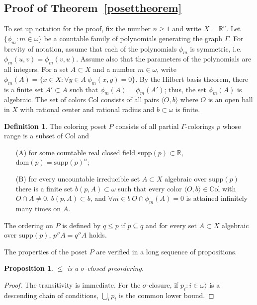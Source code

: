 \documentclass{article}
\newcommand{\gw}{\omega}
\newcommand{\gs}{\sigma}
\newcommand{\supp}{\mathrm{supp}}
\newcommand{\dom}{\mathrm{dom}}
\newcommand{\colors}{\mathrm{Col}}
\newtheorem{proposition}[theorem]{Proposition}
\theoremstyle{definition}
\newtheorem{definition}[theorem]{Definition}
\begin{document}
\subsection{Proof of Theorem~\ref{posettheorem}}

To set up notation for the proof, fix the number $n\geq 1$ and write $X=\mathbb{R}^n$. Let $\{\phi_m\colon m\in\gw\}$ be a countable family of polynomials generating the graph $\Gamma$. For brevity of notation, assume that each of the polynomials $\phi_m$ is symmetric, i.e.\  $\phi_m(u, v)=\phi_m(v, u)$. Assume also that the parameters of the polynomials are all integers. For a set $A\subset X$ and a number $m\in\gw$, write $\phi_m(A)=\{x\in X\colon\forall y\in A\ \phi_m(x, y)=0\}$. By the Hilbert basis theorem, there is a finite set $A'\subset A$ such that $\phi_m(A)=\phi_m(A')$; thus, the set $\phi_m(A)$ is algebraic. The set of colors $\colors$ consists of all pairs $\langle O, b\rangle$ where $O$ is an open ball in $X$ with rational center and rational radius and $b\subset\gw$ is finite.

\begin{definition}
\label{posetdefinition}
The coloring poset $P$ consists of all partial $\Gamma$-colorings $p$ whose range is a subset of $\colors$ and

\begin{enumerate}
\item[(A)] for some countable real closed field $\supp(p)\subset\mathbb{R}$, $\dom(p)=\supp(p)^n$;
\item[(B)] for every uncountable irreducible set $A\subset X$ algebraic over $\supp(p)$ there is a finite set $b(p, A)\subset \gw$ such that every color $\langle O, b\rangle\in\colors$ with $O\cap A\neq 0$, $b(p, A)\subset b$, and $\forall m\in b\ O\cap \phi_m(A)=0$ is attained infinitely many times on $A$.
\end{enumerate}

\noindent  The ordering on $P$ is defined by $q\leq p$ if $p\subseteq q$ and for every set $A\subset X$ algebraic over $\supp(p)$, $p''A=q''A$ holds. 
\end{definition}

\noindent The properties of the poset $P$ are verified in a long sequence of propositions.

\begin{proposition}
\label{sigmaproposition}
$\leq$ is a $\gs$-closed preordering.
\end{proposition}

\begin{proof}
The transitivity is immediate. For the $\gs$-closure, if $p_i\colon i\in\gw\rangle$ is a descending chain of conditions, $\bigcup_ip_i$ is the common lower bound.
\end{proof}
\end{document}
